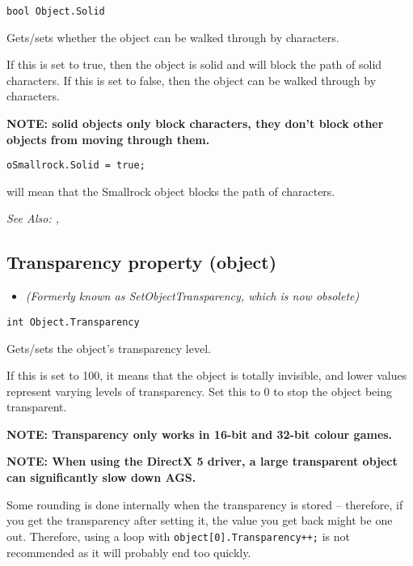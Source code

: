 \begin{verbatim}
bool Object.Solid
\end{verbatim}
Gets/sets whether the object can be walked through by characters.

If this is set to true, then the object is solid and will block the path of solid
characters. If this is set to false, then the object can be walked through by
characters.

\bf{NOTE:} solid objects only block characters, they don't block other objects from
moving through them.

\begin{verbatim}
oSmallrock.Solid = true;
\end{verbatim}
will mean that the Smallrock object blocks the path of characters.

\it{See Also:} ,


\subsection{Transparency property (object)}\label{Object.Transparency}%

\begin{itemize}
\item \it{(Formerly known as SetObjectTransparency, which is now obsolete)}
\end{itemize}

\begin{verbatim}
int Object.Transparency
\end{verbatim}
Gets/sets the object's transparency level.

If this is set to 100, it means that the object is totally invisible, and lower values
represent varying levels of transparency. Set this to 0 to stop the object being transparent.

\bf{NOTE:} Transparency only works in 16-bit and 32-bit colour games.

\bf{NOTE:} When using the DirectX 5 driver, a large transparent object can significantly slow
down AGS.

Some rounding is done internally when the transparency is stored -- therefore, if you get
the transparency after setting it, the value you get back might be one out. Therefore, using
a loop with \verb$object[0].Transparency++;$ is not recommended as it will probably
end too quickly.

